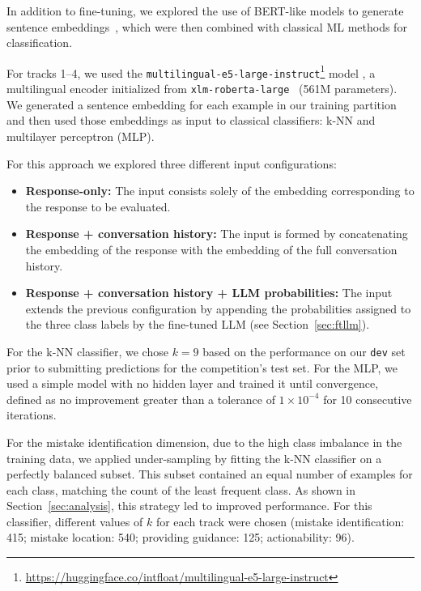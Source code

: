 \documentclass[11pt]{article}
\begin{document}
In addition to fine-tuning, we explored the use of BERT-like models to generate sentence embeddings~\cite{reimers-gurevych-2019-sentence}, which were then combined with classical ML methods for classification.

For tracks 1--4, we used the \texttt{multilingual-e5-large-instruct}\footnote{\url{https://huggingface.co/intfloat/multilingual-e5-large-instruct}} model \cite{wang2024multilingual}, a multilingual encoder initialized from \texttt{xlm-roberta-large}~\cite{conneau2019xlmroberta} (561M parameters).
We generated a sentence embedding for each example in our training partition and then used those embeddings as input to classical classifiers: k-NN and multilayer perceptron (MLP).

For this approach we explored three different input configurations:
\begin{itemize}
    \setlength\itemsep{0em}
    \item\textbf{Response-only:} The input consists solely of the embedding corresponding to the response to be evaluated.
    \item\textbf{Response + conversation history:} The input is formed by concatenating the embedding of the response with the embedding of the full conversation history.
    \item\textbf{Response + conversation history + LLM probabilities:} The input extends the previous configuration by appending the probabilities assigned to the three class labels by the fine-tuned LLM (see Section~\ref{sec:ftllm}).
\end{itemize}

For the k-NN classifier, we chose $k=9$ based on the performance on our \texttt{dev} set prior to submitting predictions for the competition's test set.
For the MLP, we used a simple model with no hidden layer and trained it until convergence, defined as no improvement greater than a tolerance of $1 \times 10^{-4}$ for 10 consecutive iterations.

For the mistake identification dimension, due to the high class imbalance in the training data, we applied under-sampling by fitting the k-NN classifier on a perfectly balanced subset.
This subset contained an equal number of examples for each class, matching the count of the least frequent class.
As shown in Section~\ref{sec:analysis}, this strategy led to improved performance.
For this classifier, different values of $k$ for each track were chosen (mistake identification: 415; mistake location: 540; providing guidance: 125; actionability: 96).
\end{document}
